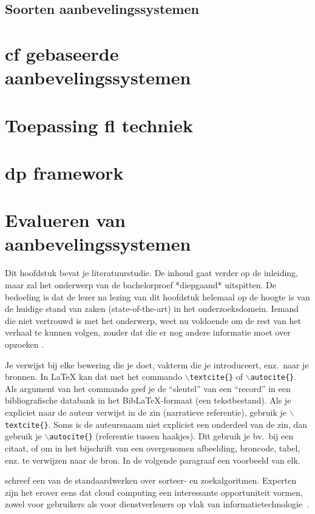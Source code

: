 \subsection{Soorten aanbevelingssystemen}
\section{\ac{cf} gebaseerde aanbevelingssystemen}
\section{Toepassing \ac{fl} techniek}
\section{\ac{dp} framework}
\section{Evalueren van aanbevelingssystemen}

Dit hoofdstuk bevat je literatuurstudie. De inhoud gaat verder op de inleiding, maar zal het onderwerp van de bachelorproef *diepgaand* uitspitten. De bedoeling is dat de lezer na lezing van dit hoofdstuk helemaal op de hoogte is van de huidige stand van zaken (state-of-the-art) in het onderzoeksdomein. Iemand die niet vertrouwd is met het onderwerp, weet nu voldoende om de rest van het verhaal te kunnen volgen, zonder dat die er nog andere informatie moet over opzoeken \autocite{Pollefliet2011}.

Je verwijst bij elke bewering die je doet, vakterm die je introduceert, enz.\ naar je bronnen. In \LaTeX{} kan dat met het commando \texttt{$\backslash${textcite\{\}}} of \texttt{$\backslash${autocite\{\}}}. Als argument van het commando geef je de ``sleutel'' van een ``record'' in een bibliografische databank in het Bib\LaTeX{}-formaat (een tekstbestand). Als je expliciet naar de auteur verwijst in de zin (narratieve referentie), gebruik je \texttt{$\backslash${}textcite\{\}}. Soms is de auteursnaam niet expliciet een onderdeel van de zin, dan gebruik je \texttt{$\backslash${}autocite\{\}} (referentie tussen haakjes). Dit gebruik je bv.~bij een citaat, of om in het bijschrift van een overgenomen afbeelding, broncode, tabel, enz. te verwijzen naar de bron. In de volgende paragraaf een voorbeeld van elk.

\textcite{Knuth1998} schreef een van de standaardwerken over sorteer- en zoekalgoritmen. Experten zijn het erover eens dat cloud computing een interessante opportuniteit vormen, zowel voor gebruikers als voor dienstverleners op vlak van informatietechnologie~\autocite{Creeger2009}.

